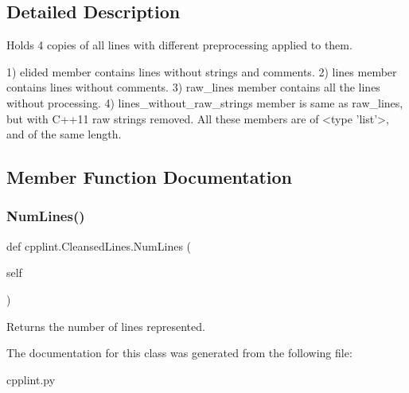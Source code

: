 \subsection{Detailed Description}
\begin{DoxyVerb}Holds 4 copies of all lines with different preprocessing applied to them.

1) elided member contains lines without strings and comments.
2) lines member contains lines without comments.
3) raw_lines member contains all the lines without processing.
4) lines_without_raw_strings member is same as raw_lines, but with C++11 raw
   strings removed.
All these members are of <type 'list'>, and of the same length.
\end{DoxyVerb}
 

\subsection{Member Function Documentation}
\mbox{\label{classcpplint_1_1CleansedLines_a26a7eff70493d64d58d16f4a406c7ee9}} 
\subsubsection{\texorpdfstring{Num\+Lines()}{NumLines()}}
{\footnotesize\ttfamily def cpplint.\+Cleansed\+Lines.\+Num\+Lines (\begin{DoxyParamCaption}\item[{}]{self }\end{DoxyParamCaption})}

\begin{DoxyVerb}Returns the number of lines represented.\end{DoxyVerb}
 

The documentation for this class was generated from the following file\+:\begin{DoxyCompactItemize}
\item 
cpplint.\+py\end{DoxyCompactItemize}
